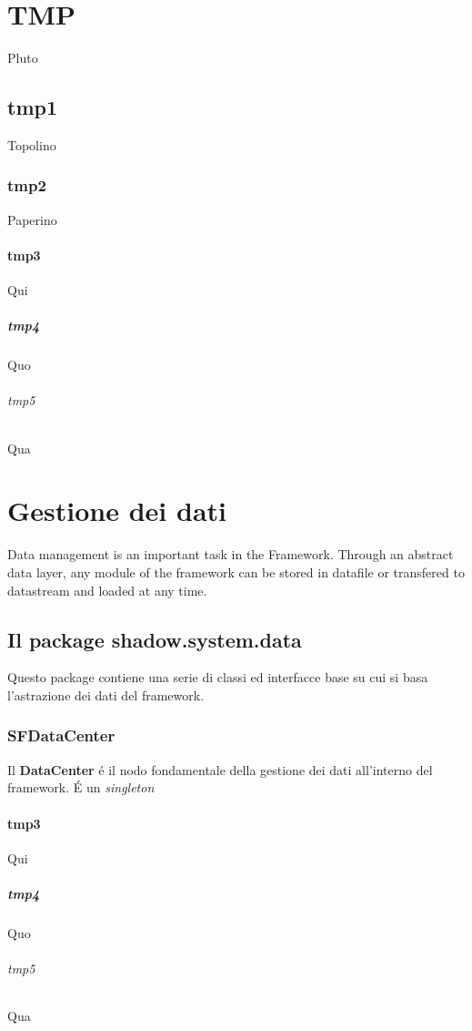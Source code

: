 \chapter*{TMP}
\label{tmp}
Pluto
\section{tmp1}
Topolino
\subsection{tmp2}
Paperino
\subsubsection{tmp3}
Qui
\paragraph{tmp4}
Quo
\subparagraph{tmp5}
Qua

%	
\chapter{Gestione dei dati}
\label{ch:gestdati}
Data management is an important task in the Framework. Through an abstract data layer, any module of the framework can be stored in datafile or transfered to datastream and loaded at any time. 

\section{Il package shadow.system.data}
Questo package contiene una serie di classi ed interfacce base su cui si basa l'astrazione dei dati del framework.

\subsection{SFDataCenter}
Il \textbf{DataCenter} \'e il nodo fondamentale della gestione dei dati all'interno del framework. \'E un \textit{singleton}

\subsubsection{tmp3}
Qui
\paragraph{tmp4}
Quo
\subparagraph{tmp5}
Qua



